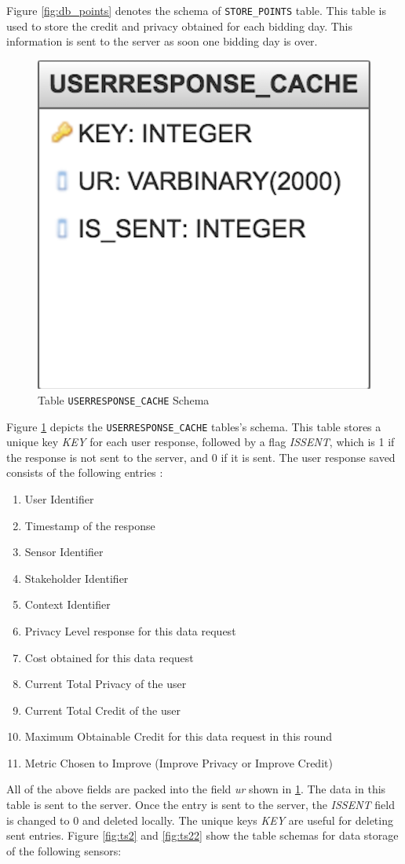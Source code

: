 Figure \ref{fig:db_points} denotes the schema of \texttt{STORE\_POINTS} table. This table is used to store the credit and privacy obtained for each bidding day.
This information is sent to the server as soon one bidding day is over.

\begin{figure}[ht!]
\centering
\includegraphics[width=0.4\linewidth]{./images/db_ur}
\caption{Table \texttt{USERRESPONSE\_CACHE} Schema}
\label{fig:db_ur}
\end{figure}

Figure \ref{fig:db_ur} depicts the \texttt{USERRESPONSE\_CACHE} tables's schema. This table stores a unique key \textit{KEY} for each user response, followed by a flag \textit{ISSENT}, which is 1 if the response is not sent to the server, and 0 if it is sent. The user response saved consists of the following entries :

\begin{enumerate}
	\item User Identifier
	\item Timestamp of the response
    \item Sensor Identifier
    \item Stakeholder Identifier
    \item Context Identifier
    \item Privacy Level response for this data request
    \item Cost obtained for this data request
    \item Current Total Privacy of the user
    \item Current Total Credit of the user
    \item Maximum Obtainable Credit for this data request in this round
    \item Metric Chosen to Improve  (Improve Privacy or Improve Credit)
\end{enumerate}

All of the above fields are packed into the field \textit{ur} shown in \ref{fig:db_ur}. The data in this table is sent to the server. Once the entry is sent to the server, the \textit{ISSENT} field is changed to 0 and deleted locally. The unique keys \textit{KEY} are useful for deleting sent entries. Figure \ref{fig:ts2} and \ref{fig:ts22} show the table schemas for data storage of the following sensors:

